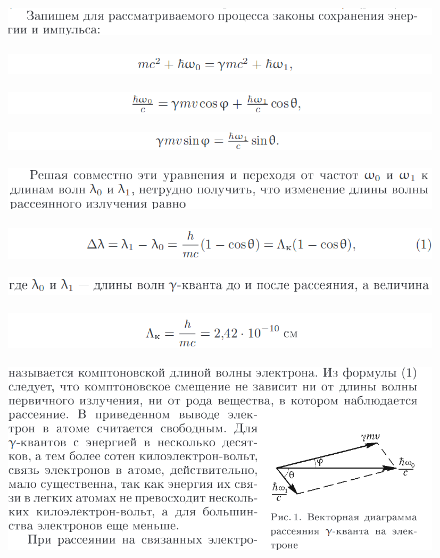 \documentclass{article}
\theoremstyle{remark}
\begin{document}
\begin{figure}[htp]
    \centering
    \includegraphics[width=1.2\linewidth]{6.png}
\end{figure}
\begin{figure}[htp]
    \centering
    \includegraphics[width=1.2\linewidth]{7.png}
\end{figure}
\begin{figure}[htp]
    \centering
    \includegraphics[width=1.2\linewidth]{8.png}
\end{figure}
\begin{figure}[htp]
    \centering
    \includegraphics[width=1.2\linewidth]{9.png}
\end{figure}
\begin{figure}[htp]
    \centering
    \includegraphics[width=1.2\linewidth]{10.png}
\end{figure}
\begin{figure}[htp]
    \centering
    \includegraphics[width=1.2\linewidth]{11.png}
\end{figure}
\begin{figure}[htp]
    \includegraphics[width=1.2\linewidth]{12.png}
\end{figure}
\begin{figure}[htp]
    \includegraphics[width=1.2\linewidth]{13.png}
\end{figure}
\begin{figure}[htp]
    \includegraphics[width=1.2\linewidth]{14.png}
\end{figure}
\end{document}
